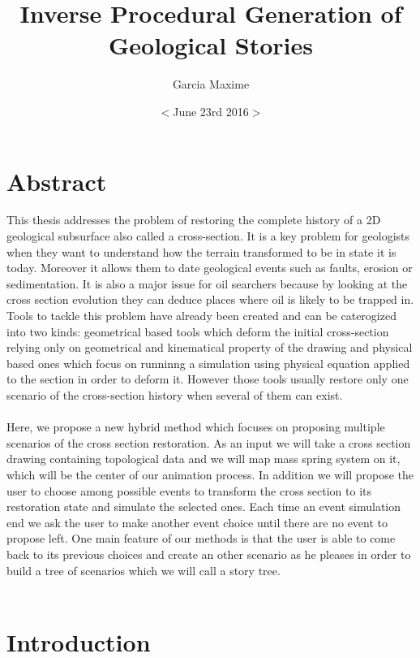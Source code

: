 \documentclass[12pt, a4paper]{memoir} %
\title{ Inverse Procedural Generation of Geological Stories}%
\author{Garcia Maxime}
\date{ $<$June 23rd 2016$>$} %
\begin{document}
\frontmatter
\begin{titlingpage}
\maketitle
\end{titlingpage}

\section{Abstract}

This thesis addresses the problem of restoring the complete history of a 2D geological 
subsurface also called a cross-section. It is a key problem for geologists when they want to understand how the terrain transformed to be in state it is today. Moreover it allows them to date geological events such as faults, erosion or sedimentation. It is also a major issue for oil searchers because by looking at the cross section evolution they can deduce places where oil is likely to be trapped in. Tools to tackle this problem have already been created and can  be caterogized into two kinds: geometrical based tools which deform the initial cross-section relying only on geometrical and kinematical property of the drawing and physical based ones which focus on runninng a simulation using physical equation applied to the section in order to deform it. However those tools usually restore only one scenario of the cross-section history when several of them can exist.\\\\
 Here, we propose a new hybrid method which focuses on proposing multiple scenarios of the cross section restoration. As an input we will take a cross section drawing containing topological data and we will map mass spring system on it, which will be the center of our animation process. In addition we will propose the user to choose among possible events to transform the cross section to its restoration state and simulate the selected ones. Each time an event simulation end we ask the user to make another event choice until there are no event to propose left. One main feature of our methods is that the user is able to come back to its previous choices and create an other scenario as he pleases in order to build a tree of scenarios which we will call a story tree.\\\\
 
\section{Introduction}
\end{document}
